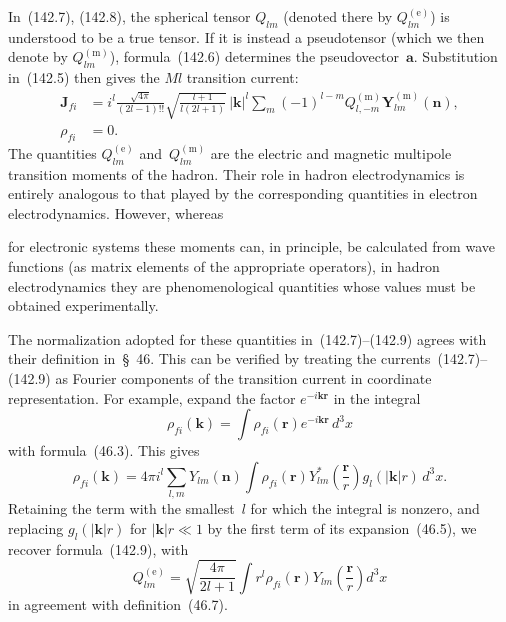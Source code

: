 In~(142.7), (142.8), the spherical tensor $Q_{lm}$ (denoted there by $Q_{lm}^{(\mathrm e)}$) is understood to be a true tensor. If it is instead a pseudotensor (which we then denote by $Q_{lm}^{(\mathrm m)}$), formula~(142.6) determines the pseudovector~$\mathbf a$. Substitution in~(142.5) then gives the $Ml$ transition current:
\begin{equation}
\begin{aligned}
\mathbf J_{fi}&=i^l\frac{\sqrt{4\pi}}{(2l-1)!!}
\sqrt{\frac{l+1}{l(2l+1)}}\,|\mathbf k|^l
\sum_m(-1)^{l-m}Q_{l,-m}^{(\mathrm m)}\mathbf Y_{lm}^{(\mathrm m)}(\mathbf n),\\
\rho_{fi}&=0.
\end{aligned}
\tag{142.9}
\end{equation}
The quantities $Q_{lm}^{(\mathrm e)}$ and~$Q_{lm}^{(\mathrm m)}$ are the electric and magnetic multipole transition moments of the hadron. Their role in hadron electrodynamics is entirely analogous to that played by the corresponding quantities in electron electrodynamics. However, whereas

for electronic systems these moments can, in principle, be calculated from wave functions (as matrix elements of the appropriate operators), in hadron electrodynamics they are phenomenological quantities whose values must be obtained experimentally.

The normalization adopted for these quantities in~(142.7)--(142.9) agrees with their definition in~\S~46. This can be verified by treating the currents~(142.7)--(142.9) as Fourier components of the transition current in coordinate representation. For example, expand the factor $e^{-i\mathbf k\mathbf r}$ in the integral
\begin{equation}
\rho_{fi}(\mathbf k)=\int\rho_{fi}(\mathbf r)e^{-i\mathbf k\mathbf r}\,d^3x
\tag{142.10}
\end{equation}
with formula~(46.3). This gives
\[
\rho_{fi}(\mathbf k)=4\pi i^l\sum_{l,m}Y_{lm}(\mathbf n)
\int\rho_{fi}(\mathbf r)Y^*_{lm}\left(\frac{\mathbf r}{r}\right)
g_l(|\mathbf k|r)\,d^3x.
\]
Retaining the term with the smallest~$l$ for which the integral is nonzero, and replacing $g_l(|\mathbf k|r)$ for $|\mathbf k|r\ll1$ by the first term of its expansion~(46.5), we recover formula~(142.9), with
\begin{equation}
Q_{lm}^{(\mathrm e)}=\sqrt{\frac{4\pi}{2l+1}}
\int r^l\rho_{fi}(\mathbf r)Y_{lm}\left(\frac{\mathbf r}{r}\right)d^3x
\tag{142.11}
\end{equation}
in agreement with definition~(46.7).


